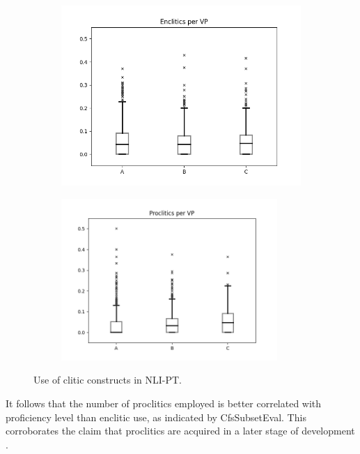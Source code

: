 \begin{figure}
\centering
\begin{subfigure}{1.0\textwidth}
  \centering
  \includegraphics[width=0.9\linewidth]{images/enc.png}
\end{subfigure}%

\begin{subfigure}{1.0\textwidth}
  \centering
  \includegraphics[width=0.9\textwidth]{images/proc.png}
\end{subfigure}
\caption{Use of clitic constructs in NLI-PT.}
\label{fig:clitics}
\end{figure}

It follows that the number of proclitics employed is better correlated with proficiency level than enclitic use, as indicated by CfsSubsetEval. This corroborates the claim that proclitics are acquired in a later stage of development \citep{flores2014, costa2015}.

